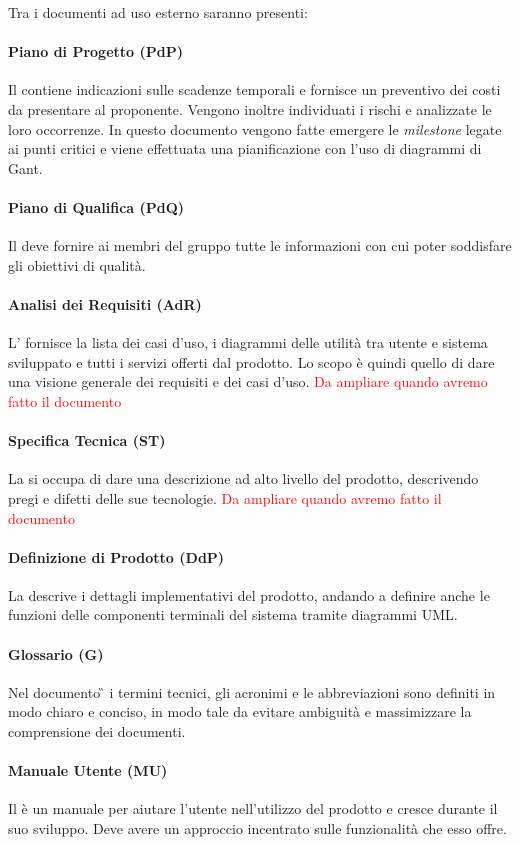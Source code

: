 Tra i documenti ad uso esterno saranno presenti:
\paragraph{Piano di Progetto (PdP)}
Il \PdP{} contiene indicazioni sulle scadenze temporali e fornisce un preventivo dei costi da presentare al proponente. Vengono inoltre individuati i rischi e analizzate le loro occorrenze.
In questo documento vengono fatte emergere le \emph{milestone} legate ai punti critici e viene effettuata una pianificazione con l'uso di diagrammi di Gant.
\paragraph{Piano di Qualifica (PdQ)} 
Il \PdQ{} deve fornire ai membri del gruppo tutte le informazioni con cui poter soddisfare gli obiettivi di qualità.
\paragraph{Analisi dei Requisiti (AdR)}
L'\AdR{} fornisce la lista dei casi d'uso, i diagrammi delle utilità tra utente e sistema sviluppato e tutti i servizi offerti dal prodotto. Lo scopo è quindi quello di dare una visione generale dei requisiti e dei casi d'uso. \textcolor{red}{Da ampliare quando avremo fatto il documento}
\paragraph{Specifica Tecnica (ST)}
La \SP{} si occupa di dare una descrizione ad alto livello del prodotto, descrivendo pregi e difetti delle sue tecnologie. \textcolor{red}{Da ampliare quando avremo fatto il documento}
\paragraph{Definizione di Prodotto (DdP)}
La \DdP{} descrive i dettagli implementativi del prodotto, andando a definire anche le funzioni delle componenti terminali del sistema tramite diagrammi UML.
\paragraph{Glossario (G)}
Nel documento \G{} i termini tecnici, gli acronimi e le abbreviazioni sono definiti in modo chiaro e conciso, in modo tale da evitare ambiguità e massimizzare la comprensione dei documenti.
\paragraph{Manuale Utente (MU)}
Il \MU{} è un manuale per aiutare l'utente nell'utilizzo del prodotto e cresce durante il suo sviluppo. Deve avere un approccio incentrato sulle funzionalità che esso offre.
